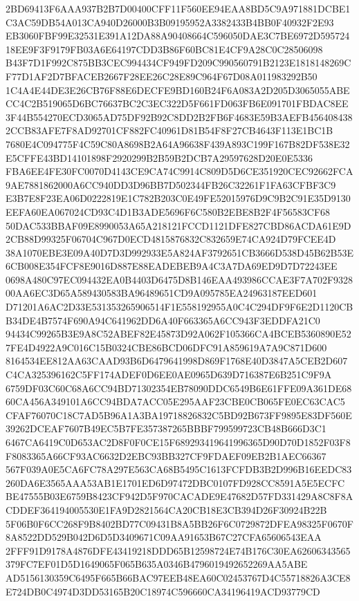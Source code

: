 \documentclass[UTF8,fontset=fandol,zihao=-4,a4paper]{ctexart}
\begin{document}
{{2BD69413F6AAA937B2B7D00400CFF11F560EE94EAA8BD5C9A971881DCBE1C3AC59DB54A013CA940D26000B3B09195952A3382433B4BB0F40932F2E93
EB3060FBF99E32531E391A12DA88A90408664C596050DAE3C7BE6972D59572418EE9F3F9179FB03A6E64197CDD3B86F60BC81E4CF9A28C0C28506098
B43F7D1F992C875BB3CEC994434CF949FD209C990560791B2123E1818148269CF77D1AF2D7BFACEB2667F28EE26C28E89C964F67D08A011983292B50
1C4A4E44DE3E26CB76F88E6DECFE9BD160B24F6A083A2D205D3065055ABECC4C2B519065D6BC76637BC2C3EC322D5F661FD063FB6E091701FBDAC8EE
3F44B554270ECD3065AD75DF92B92C8DD2B2FB6F4683E59B3AEFB4564084382CCB83AFE7F8AD92701CF882FC40961D81B54F8F27CB4643F113E1BC1B
7680E4C094775F4C59C80A8698B2A64A96638F439A893C199F167B82DF538E32E5CFFE43BD14101898F2920299B2B59B2DCB7A29597628D20E0E5336
FBA6EE4FE30FC0070D4143CE9CA74C9914C809D5D6CE351920CEC92662FCA9AE7881862000A6CC940DD3D96BB7D502344FB26C32261F1FA63CFBF3C9
E3B7E8F23EA06D0222819E1C782B203C0E49FE52015976D9C9B2C91E35D9130EEFA60EA067024CD93C4D1B3ADE5696F6C580B2EBE8B2F4F56583CF68
50DAC533BBAF09E8990053A65A218121FCCD1121DFE827CBD86ACDA61E9D2CB88D99325F06704C967D0ECD4815876832C832659E74CA924D79FCEE4D
38A1070EBE3E09A40D7D3D992933E5A824AF3792651CB3666D538D45B62B53E6CB008E354FCF8E9016D887E88EADEBEB9A4C3A7DA69ED9D7D72243EE
0698A480C97EC094432EA0B4403D6475D8B146EAA493986CCAE3F7A702F932800AA6EC3D65A589430583BA96489651CD9A095785EA24963187EED601
D71201A6AC2D33E531353265906514F1E558192955A0C4C294DF9F6E2D1120CBB34DE4B7574F690A94C641962DD6A40F663365A6CC943F3EDDFA21C0
94434C99265B3E9A8C52ABEF82E45873D92A062F105366CA4BCEB5360890E527FE4D4922A9C016C15B0324CBE86BCD06DFC91A859619A7A9C871D600
8164534EE812AA63CAAD93B6D6479641998D869F1768E40D3847A5CEB2D607C4CA325396162C5FF174ADEF0D6EE0AE0965D639D716387E6B251C9F9A
6759DF03C60C68A6CC94BD71302354EB78090DDC6549B6E61FFE09A361DE6860CA456A349101A6CC94BDA7ACC05E295AAF23CBE0CB065FE0EC63CAC5
CFAF76070C18C7AD5B96A1A3BA19718826832C5BD92B673FF9895E83DF560E39262DCEAF7607B49EC5B7FE357387265BBBF799599723CB48B666D3C1
6467CA6419C0D653AC2D8F0F0CE15F689293419641996365D90D70D1852F03F8F8083365A66CF93AC6632D2EBC93BB327CF9FDAEF09EB2B1AEC66367
567F039A0E5CA6FC78A297E563CA68B5495C1613FCFDB3B2D996B16EEDC83260DA6E3565AAA53AB1E1701ED6D97472DBC0107FD928CC8591A5E5ECFC
BE47555B03E6759B8423CF942D5F970CACADE9E47682D57FD331429A8C8F8ACDDEF364194005530E1FA9D2821564CA20CB18E3CB394D26F30924B22B
5F06B0F6CC268F9B8402BD77C09431B8A5BB26F6C0729872DFEA98325F0670F8A8522DD529B042D6D5D3409671C09AA91653B67C27CFA65606543EAA
2FFF91D9178A4876DFE43419218DDD65B12598724E74B176C30EA62606343565379FC7EF01D5D1649065F065B635A0346B4796019492652269AA5ABE
AD5156130359C6495F665B66BAC97EEB48EA60C02453767D4C55718826A3CE8E724DB0C4974D3DD53165B20C18974C596660CA34196419ACD93779CD
}}
\end{document}
